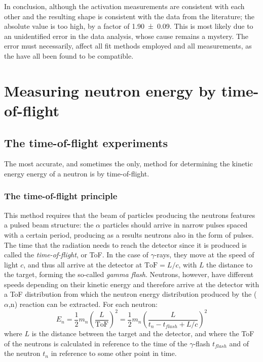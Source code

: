 \documentclass[a4paper,12pt]{report}
\newcommand{\an}{($\alpha$,n) }
\begin{document}
In conclusion, although the activation measurements are consistent with each other and the resulting shape is consistent with the data from the literature; the absolute value is too high, by a factor of \num{1.90(9)}.
This is most likely due to an unidentified error in the data analysis, whose cause remains a mystery.
The error must necessarily, affect all fit methods employed and all measurements, as the have all been found to be compatible.



\chapter{Measuring neutron energy by time-of-flight}

\section{The time-of-flight experiments}
The most accurate, and sometimes the only, method for determining the kinetic energy energy of a neutron is by time-of-flight.

\subsection{The time-of-flight principle} 
This method requires that the beam of particles producing the neutrons features a pulsed beam structure: the $\alpha$ particles should arrive in narrow pulses spaced with a certain period, producing as a results neutrons also in the form of pulses.
\\

The time that the radiation needs to reach the detector since it is produced is called the \textit{time-of-flight}, or ToF.
In the case of $\gamma$-rays, they move at the speed of light $c$, and thus all arrive at the detector at $\text{ToF}=L/c$, with $L$ the distance to the target, forming the so-called  \textit{gamma flash}.
Neutrons, however, have different speeds depending on their kinetic energy and therefore arrive at the detector with a ToF distribution from which the neutron energy distribution produced by the \an reaction can be extracted.
For each neutron:
\begin{equation}
	E_n=\frac{1}{2} m_n \left( \frac{L}{\text{ToF}} \right)^2 = \frac{1}{2} m_n \left( \frac{L}{t_n - t_{flash} + L/c} \right)^2
	\label{Eq_ToF2En}
\end{equation}
where $L$ is the distance between the target and the detector, and where the ToF of the neutrons is calculated in reference to the time of the $\gamma$-flash $t_{flash}$ and of the neutron $t_n$ in reference to some other point in time.
\end{document}
